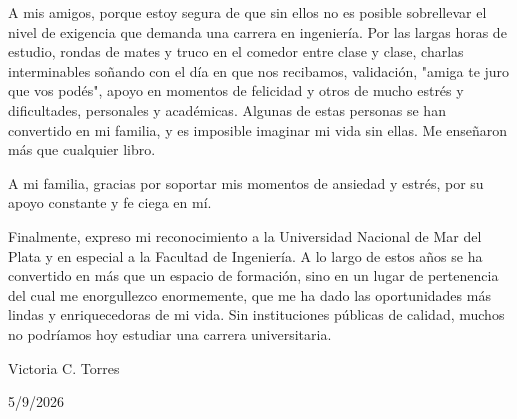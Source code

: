 A mis amigos, porque estoy segura de que sin ellos no es posible sobrellevar el nivel de exigencia que demanda una carrera en ingeniería. Por las largas horas de estudio, rondas de mates y truco en el comedor entre clase y clase, charlas interminables soñando con el día en que nos recibamos, validación, "amiga te juro que vos podés", apoyo en momentos de felicidad y otros de mucho estrés y dificultades, personales y académicas. Algunas de estas personas se han convertido en mi familia, y es imposible imaginar mi vida sin ellas. Me enseñaron más que cualquier libro.

A mi familia, gracias por soportar mis momentos de ansiedad y estrés, por su apoyo constante y fe ciega en mí.

Finalmente, expreso mi reconocimiento a la Universidad Nacional de Mar del Plata y en especial a la Facultad de Ingeniería. A lo largo de estos años se ha convertido en más que un espacio de formación, sino en un lugar de pertenencia del cual me enorgullezco enormemente, que me ha dado las oportunidades más lindas y enriquecedoras de mi vida. Sin instituciones públicas de calidad, muchos no podríamos hoy estudiar una carrera universitaria. 

\vspace{18pt}
Victoria C. Torres

5/9/2026

\thispagestyle{empty}